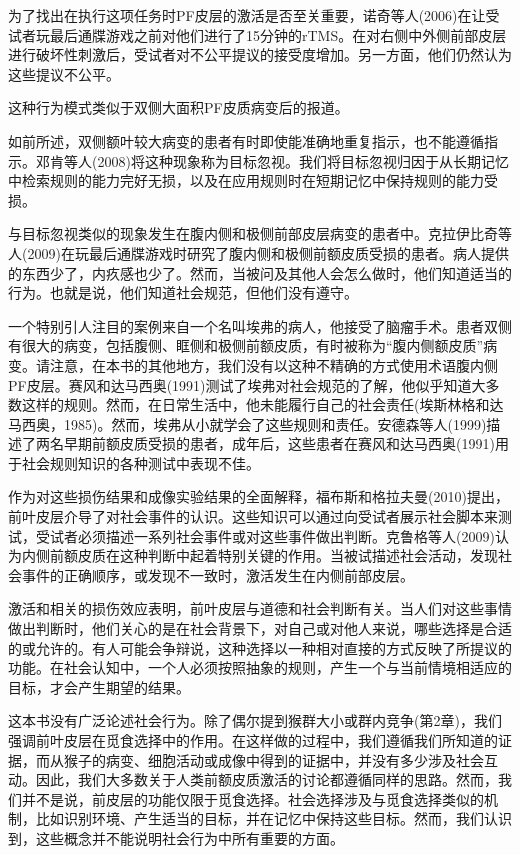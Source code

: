 为了找出在执行这项任务时PF皮层的激活是否至关重要，诺奇等人(2006)在让受试者玩最后通牒游戏之前对他们进行了15分钟的rTMS。在对右侧中外侧前部皮层进行破坏性刺激后，受试者对不公平提议的接受度增加。另一方面，他们仍然认为这些提议不公平。

这种行为模式类似于双侧大面积PF皮质病变后的报道。

如前所述，双侧额叶较大病变的患者有时即使能准确地重复指示，也不能遵循指示。邓肯等人(2008)将这种现象称为目标忽视。我们将目标忽视归因于从长期记忆中检索规则的能力完好无损，以及在应用规则时在短期记忆中保持规则的能力受损。

与目标忽视类似的现象发生在腹内侧和极侧前部皮层病变的患者中。克拉伊比奇等人(2009)在玩最后通牒游戏时研究了腹内侧和极侧前额皮质受损的患者。病人提供的东西少了，内疚感也少了。然而，当被问及其他人会怎么做时，他们知道适当的行为。也就是说，他们知道社会规范，但他们没有遵守。

一个特别引人注目的案例来自一个名叫埃弗的病人，他接受了脑瘤手术。患者双侧有很大的病变，包括腹侧、眶侧和极侧前额皮质，有时被称为“腹内侧额皮质”病变。请注意，在本书的其他地方，我们没有以这种不精确的方式使用术语腹内侧PF皮层。赛风和达马西奥(1991)测试了埃弗对社会规范的了解，他似乎知道大多数这样的规则。然而，在日常生活中，他未能履行自己的社会责任(埃斯林格和达马西奥，1985)。然而，埃弗从小就学会了这些规则和责任。安德森等人(1999)描述了两名早期前额皮质受损的患者，成年后，这些患者在赛风和达马西奥(1991)用于社会规则知识的各种测试中表现不佳。

作为对这些损伤结果和成像实验结果的全面解释，福布斯和格拉夫曼(2010)提出，前叶皮层介导了对社会事件的认识。这些知识可以通过向受试者展示社会脚本来测试，受试者必须描述一系列社会事件或对这些事件做出判断。克鲁格等人(2009)认为内侧前额皮质在这种判断中起着特别关键的作用。当被试描述社会活动，发现社会事件的正确顺序，或发现不一致时，激活发生在内侧前部皮层。

激活和相关的损伤效应表明，前叶皮层与道德和社会判断有关。当人们对这些事情做出判断时，他们关心的是在社会背景下，对自己或对他人来说，哪些选择是合适的或允许的。有人可能会争辩说，这种选择以一种相对直接的方式反映了所提议的功能。在社会认知中，一个人必须按照抽象的规则，产生一个与当前情境相适应的目标，才会产生期望的结果。

这本书没有广泛论述社会行为。除了偶尔提到猴群大小或群内竞争(第2章)，我们强调前叶皮层在觅食选择中的作用。在这样做的过程中，我们遵循我们所知道的证据，而从猴子的病变、细胞活动或成像中得到的证据中，并没有多少涉及社会互动。因此，我们大多数关于人类前额皮质激活的讨论都遵循同样的思路。然而，我们并不是说，前皮层的功能仅限于觅食选择。社会选择涉及与觅食选择类似的机制，比如识别环境、产生适当的目标，并在记忆中保持这些目标。然而，我们认识到，这些概念并不能说明社会行为中所有重要的方面。

